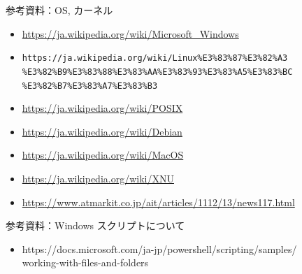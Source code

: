 \documentclass[12pt,aspectratio=169]{beamer}
\begin{document}
\begin{frame}{参考資料：OS, カーネル}
  \begin{itemize}
    \item \url { https://ja.wikipedia.org/wiki/Microsoft_Windows }
    \item \texttt {https://ja.wikipedia.org/wiki/Linux\%E3\%83\%87\%E3\%82\%A3 \\ \%E3\%82\%B9\%E3\%83\%88\%E3\%83\%AA\%E3\%83\%93\%E3\%83\%A5\%E3\%83\%BC \\ \%E3\%82\%B7\%E3\%83\%A7\%E3\%83\%B3 }
    \item \url { https://ja.wikipedia.org/wiki/POSIX }
    \item \url { https://ja.wikipedia.org/wiki/Debian }
    \item \url { https://ja.wikipedia.org/wiki/MacOS }
    \item \url { https://ja.wikipedia.org/wiki/XNU }
    \item \url { https://www.atmarkit.co.jp/ait/articles/1112/13/news117.html }
  \end{itemize}

\end{frame}


\begin{frame}{参考資料：Windows スクリプトについて}
  \begin{itemize}
    \item https://docs.microsoft.com/ja-jp/powershell/scripting/samples/\\ working-with-files-and-folders
  \end{itemize}

\end{frame}
\end{document}
